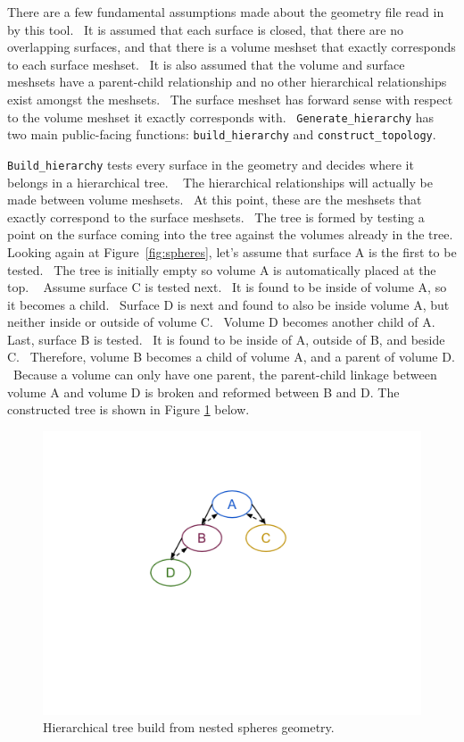 There are a few fundamental assumptions made about the geometry file read in by this tool.  It is assumed 
that each surface is closed, that there are no overlapping surfaces, and that there is a volume meshset that 
exactly corresponds to each surface meshset.  It is also assumed that the volume and surface meshsets have a 
parent-child relationship and no other hierarchical relationships exist amongst the meshsets.  The surface 
meshset has forward sense with respect to the volume meshset it exactly corresponds with.  \texttt{Generate\_hierarchy}
has two main public-facing functions: \texttt{build\_hierarchy} and \texttt{construct\_topology}.  

\texttt{Build\_hierarchy} tests every surface in the geometry and decides where it belongs in a hierarchical tree.  
The hierarchical relationships will actually be made between volume meshsets.  At this point, these are the 
meshsets that exactly correspond to the surface meshsets.  The tree is formed by testing a point on the surface 
coming into the tree against the volumes already in the tree. Looking again at Figure~\ref{fig:spheres}, let’s assume that 
surface A is the first to be tested.  The tree is initially empty so volume A is automatically placed at the top.  
Assume surface C is tested next.  It is found to be inside of volume A, so it becomes a child.  Surface D is next 
and found to also be inside volume A, but neither inside or outside of volume C.  Volume D becomes another child of A.  
Last, surface B is tested.  It is found to be inside of A, outside of B, and beside C.  Therefore, volume B becomes a 
child of volume A, and a parent of volume D.  Because a volume can only have one parent, the parent-child linkage 
between volume A and volume D is broken and reformed between B and D.  The constructed tree is shown in Figure \ref{fig:tree} below.

\begin{figure}
 \begin{centering}
 \centering
 \includegraphics[width=\paperwidth]{../figs/tree.png}
 \caption{Hierarchical tree build from nested spheres geometry.}
 \label{fig:tree}
 \end{centering}
\end{figure}

